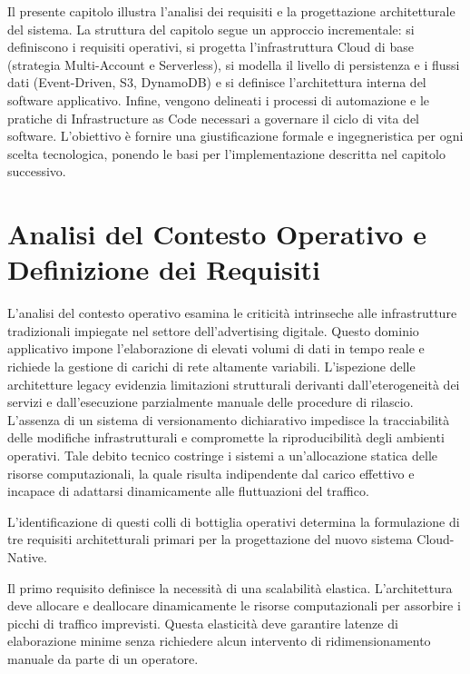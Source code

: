 Il presente capitolo illustra l'analisi dei requisiti e la progettazione architetturale del sistema. La struttura del capitolo segue un approccio incrementale: si definiscono i requisiti operativi, si progetta l'infrastruttura Cloud di base (strategia Multi-Account e Serverless), si modella il livello di persistenza e i flussi dati (Event-Driven, S3, DynamoDB) e si definisce l'architettura interna del software applicativo. Infine, vengono delineati i processi di automazione e le pratiche di Infrastructure as Code necessari a governare il ciclo di vita del software. L'obiettivo è fornire una giustificazione formale e ingegneristica per ogni scelta tecnologica, ponendo le basi per l'implementazione descritta nel capitolo successivo.

\section{Analisi del Contesto Operativo e Definizione dei Requisiti}
\label{sec:analisi_contesto}

L'analisi del contesto operativo esamina le criticità intrinseche alle infrastrutture tradizionali impiegate nel settore dell'advertising digitale. Questo dominio applicativo impone l'elaborazione di elevati volumi di dati in tempo reale e richiede la gestione di carichi di rete altamente variabili. L'ispezione delle architetture legacy evidenzia limitazioni strutturali derivanti dall'eterogeneità dei servizi e dall'esecuzione parzialmente manuale delle procedure di rilascio. L'assenza di un sistema di versionamento dichiarativo impedisce la tracciabilità delle modifiche infrastrutturali e compromette la riproducibilità degli ambienti operativi. Tale debito tecnico costringe i sistemi a un'allocazione statica delle risorse computazionali, la quale risulta indipendente dal carico effettivo e incapace di adattarsi dinamicamente alle fluttuazioni del traffico.

L'identificazione di questi colli di bottiglia operativi determina la formulazione di tre requisiti architetturali primari per la progettazione del nuovo sistema Cloud-Native.

Il primo requisito definisce la necessità di una scalabilità elastica. L'architettura deve allocare e deallocare dinamicamente le risorse computazionali per assorbire i picchi di traffico imprevisti. Questa elasticità deve garantire latenze di elaborazione minime senza richiedere alcun intervento di ridimensionamento manuale da parte di un operatore.

